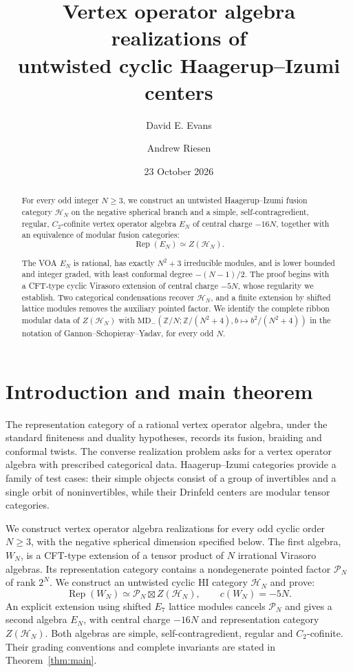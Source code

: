 \documentclass[11pt,a4paper]{article}
\title{\textbf{Vertex operator algebra realizations of\\untwisted cyclic Haagerup--Izumi centers}}
\author{David E. Evans\and Andrew Riesen}
\date{23 October 2026}
\numberwithin{equation}{section}
\theoremstyle{definition}\newtheorem{definition}[theorem]{Definition}
\theoremstyle{remark}\newtheorem{remark}[theorem]{Remark}
\begin{document}
\maketitle
\begin{abstract}
For every odd integer $N\geq3$, we construct an untwisted
Haagerup--Izumi fusion category $\mathcal H_N$ on the negative spherical
branch and a simple, self-contragredient, regular, $C_2$-cofinite vertex
operator algebra $E_N$ of central charge $-16N$, together with an equivalence of modular fusion categories:
\[
 \operatorname{Rep}(E_N)\simeq Z(\mathcal H_N).
\]

The VOA $E_N$ is rational, has exactly $N^2+3$ irreducible modules,
and is lower bounded and integer graded, with least conformal degree
$-(N-1)/2$.
The proof begins with a CFT-type cyclic Virasoro extension of central
charge $-5N$, whose regularity we establish. Two categorical
condensations recover $\mathcal H_N$, and a finite extension by
shifted lattice modules removes the auxiliary pointed factor.
We identify the complete ribbon modular data of $Z(\mathcal H_N)$ with
$\mathrm{MD}_{-}(\mathbb Z/N;\mathbb Z/(N^2+4),b\mapsto b^2/(N^2+4))$
in the notation of Gannon--Schopieray--Yadav, for every odd $N$.
\end{abstract}


\section{Introduction and main theorem}
\label{sec:intro}

The representation category of a rational vertex operator algebra,
under the standard finiteness and duality hypotheses, records its
fusion, braiding and conformal twists. The converse realization problem
asks for a vertex operator algebra with prescribed categorical data.
Haagerup--Izumi categories provide a family of test cases: their simple
objects consist of a group of invertibles and a single orbit of
noninvertibles, while their Drinfeld centers are modular tensor categories.

We construct vertex operator algebra realizations for every odd cyclic
order $N\geq3$, with the negative spherical dimension specified below.
The first algebra, $W_N$, is a CFT-type extension of a tensor product
of $N$ irrational Virasoro algebras. Its representation category
contains a nondegenerate pointed factor $\mathcal P_N$ of rank $2^N$.
We construct an untwisted cyclic HI category $\mathcal H_N$ and prove:
\[
 \operatorname{Rep}(W_N)\simeq
 \mathcal P_N\boxtimes Z(\mathcal H_N),
 \qquad c(W_N)=-5N.
\]
An explicit extension using shifted $E_7$ lattice modules cancels
$\mathcal P_N$ and gives a second algebra $E_N$, with central charge
$-16N$ and representation category $Z(\mathcal H_N)$. Both algebras
are simple, self-contragredient, regular and $C_2$-cofinite. Their
grading conventions and complete invariants are stated in
Theorem~\ref{thm:main}.
\end{document}
